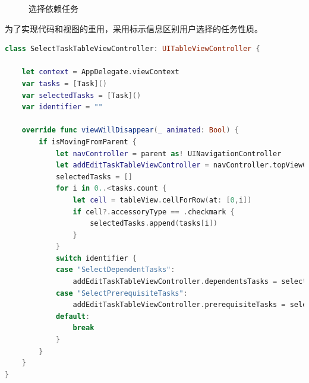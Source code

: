 \begin{figure}[H]
	\centering
	\caption{选择依赖任务}
\end{figure}

为了实现代码和视图的重用，采用标示信息区别用户选择的任务性质。

\begin{lstlisting}[language={Swift}, caption={选择任务界面的代码}]
class SelectTaskTableViewController: UITableViewController {

    let context = AppDelegate.viewContext
    var tasks = [Task]()
    var selectedTasks = [Task]()
    var identifier = ""
    
    override func viewWillDisappear(_ animated: Bool) {
        if isMovingFromParent {
            let navController = parent as! UINavigationController
            let addEditTaskTableViewController = navController.topViewController as! AddEditTaskTableViewController
            selectedTasks = []
            for i in 0..<tasks.count {
                let cell = tableView.cellForRow(at: [0,i])
                if cell?.accessoryType == .checkmark {
                    selectedTasks.append(tasks[i])
                }
            }
            switch identifier {
            case "SelectDependentTasks":
                addEditTaskTableViewController.dependentsTasks = selectedTasks
            case "SelectPrerequisiteTasks":
                addEditTaskTableViewController.prerequisiteTasks = selectedTasks
            default:
                break
            }
        }
    }
}
\end{lstlisting}


